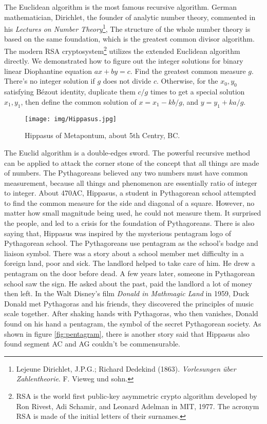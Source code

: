\documentclass{article}
\begin{document}
The Euclidean algorithm is the most famous recursive algorithm. German mathematician, Dirichlet, the founder of analytic number theory, commented in his {\em Lectures on Number Theory}\footnote{Lejeune Dirichlet, J.P.G.; Richard Dedekind (1863). {\em Vorlesungen über Zahlentheorie}. F. Vieweg und sohn.}, The structure of the whole number theory is based on the same foundation, which is the greatest common divisor algorithm. The modern RSA cryptosystem\footnote{RSA is the world first public-key asymmetric crypto algorithm developed by Ron Rivest, Adi Schamir, and Leonard Adelman in MIT, 1977. The acronym RSA is made of the initial letters of their surnames.} utilizes the extended Euclidean algorithm directly. We demonstrated how to figure out the integer solutions for binary linear Diophantine equation $ax + by = c$. Find the greatest common measure $g$. There's no integer solution if $g$ does not divide $c$. Otherwise, for the $x_0, y_0$ satisfying Bézout identity, duplicate them $c/g$ times to get a special solution $x_1, y_1$, then define the common solution of $x = x_1 - k b / g$, and $y = y_1 + k a / g$.

\begin{wrapfigure}{R}{0.32\textwidth}
 \centering
 \texttt{[image: img/Hippasus.jpg]}
 \captionsetup{labelformat=empty}
 \caption{Hippasus of Metapontum, about 5th Centry, BC.}
 \label{fig:Hippasus}
\end{wrapfigure}

The Euclid algorithm is a double-edges sword. The powerful recursive method can be applied to attack the corner stone of the concept that all things are made of numbers. The Pythagoreans believed any two numbers must have common measurement, because all things and phenomenon are essentially ratio of integer to integer. About 470AC, Hippasus, a student in Pythagorean school attempted to find the common measure for the side and diagonal of a square. However, no matter how small magnitude being used, he could not measure them. It surprised the people, and led to a crisis for the foundation of Pythagoreans. There is also saying that, Hippasus was inspired by the mysterious pentagram logo of Pythagorean school. The Pythagoreans use pentagram as the school's badge and liaison symbol. There was a story about a school member met difficulty in a foreign land, poor and sick. The landlord helped to take care of him. He drew a pentagram on the door before dead. A few years later, someone in Pythagorean school saw the sign. He asked about the past, paid the landlord a lot of money then left\cite{HanXueTao16}. In the Walt Disney's film {\em Donald in Mathmagic Land} in 1959, Duck Donald met Pythagoras and his friends, they discovered the principles of music scale together. After shaking hands with Pythagoras, who then vanishes, Donald found on his hand a pentagram, the symbol of the secret Pythagorean society. As shown in figure \ref{fig:pentagram}, there is another story said that Hippasus also found segment AC and AG couldn't be commensurable.
\end{document}
